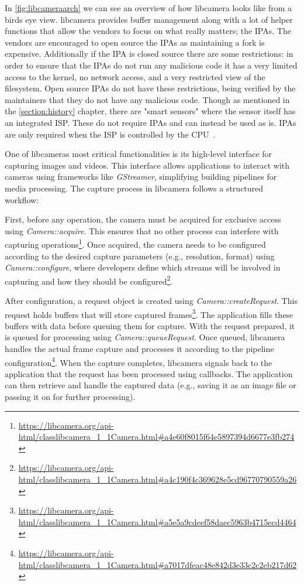 In \cref{fig:libcameraarch} we can see an overview of how libcamera looks like
from a birds eye view. libcamera provides buffer management along with a lot of
helper functions that allow the vendors to focus on what really matters; the
IPAs. The vendors are encouraged to open source the IPAs as maintaining a fork
is expensive. Additionally if the IPA is closed source there are some
restrictions: in order to ensure that the IPAs do not run any malicious code it
has a very limited access to the kernel, no network access, and a very
restricted view of the filesystem. Open source IPAs do not have these
restrictions, being verified by the maintainers that they do not have any
malicious code. Though as mentioned in the \cref{section:history} chapter,
there are "smart sensors" where the sensor itself has an integrated ISP. These
do not require IPAs and can instead be used as is. IPAs are only required when
the ISP is controlled by the CPU~\cite{libcameraStack}.

One of libcameras most critical functionalities is its high-level interface
for capturing images and videos. This interface allows applications to
interact with cameras using frameworks like \textit{GStreamer}, simplifying
building pipelines for media processing. The capture process in libcamera
follows a structured workflow:

First, before any operation, the camera must be acquired for exclusive access
using \textit{Camera::acquire}. This ensures that no other process can interfere with
capturing operations\footnote{\url{https://libcamera.org/api-html/classlibcamera_1_1Camera.html\#a4e60f8015f64e5897394d6677e3fb274}}.
Once acquired, the camera needs to be configured according to the desired
capture parameters (e.g., resolution, format) using \textit{Camera::configure}, where
developers define which streams will be involved in capturing and how they
should be configured\footnote{\url{https://libcamera.org/api-html/classlibcamera_1_1Camera.html\#a4c190f4c369628e5cd96770790559a26}}.

After configuration, a request object is created using \textit{Camera::createRequest}.
This request holds buffers that will store captured frames\footnote{\url{https://libcamera.org/api-html/classlibcamera_1_1Camera.html\#a5e5a9cdeef58daec5963b4715ecd4464}}.
The application fills these buffers with data before queuing them for capture.
With the request prepared, it is queued for processing using
\textit{Camera::queueRequest}. Once queued, libcamera handles the actual frame
capture and processes it according to the pipeline configuration\footnote{\url{https://libcamera.org/api-html/classlibcamera_1_1Camera.html\#a7017dfeac48e842d3e33c2c2eb217d62}}.
When the capture completes, libcamera signals back to the application that the
request has been processed using callbacks. The application can then retrieve
and handle the captured data (e.g., saving it as an image file or passing it on
for further processing).

